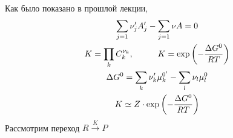 
\begin{lecture}
\begin{lecSection}
	Как было показано в прошлой лекции, 
	\begin{gather*}
		\sum\limits_{j=1} \nu_j' A_j' - \sum\limits_{j=1} \nu A = 0 \\
		K = \prod\limits_{k} C_k^{\nu_k},  \hspace*{1cm} K = \exp\left( -\dfrac{\Delta G^0}{RT} \right) \\
		\Delta G^0 = \sum\limits_{k} \nu_k' \mu_k^{0'}
		- \sum\limits_l \nu_l \mu_l^0 \\
		K \simeq Z \cdot \exp\left( -\dfrac{\Delta G^0}{RT} \right) \\
	\end{gather*}
	Рассмотрим переход $ R \xrightarrow{K} P $
	

\end{lecSection}
\end{lecture}
